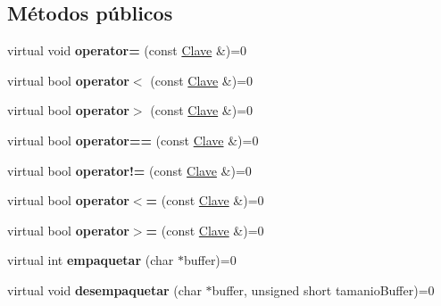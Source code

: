 \subsection*{\-Métodos públicos}
\begin{DoxyCompactItemize}
\item 
\hypertarget{class_clave_a127484386e919473d48224e8a031f804}{virtual void {\bfseries operator=} (const \hyperlink{class_clave}{\-Clave} \&)=0}\label{class_clave_a127484386e919473d48224e8a031f804}

\item 
\hypertarget{class_clave_a21773e9e0bbee22cceb7d6dc9d2c3138}{virtual bool {\bfseries operator$<$} (const \hyperlink{class_clave}{\-Clave} \&)=0}\label{class_clave_a21773e9e0bbee22cceb7d6dc9d2c3138}

\item 
\hypertarget{class_clave_a1184b1c4de99b7dde9ae5f768a18fc72}{virtual bool {\bfseries operator$>$} (const \hyperlink{class_clave}{\-Clave} \&)=0}\label{class_clave_a1184b1c4de99b7dde9ae5f768a18fc72}

\item 
\hypertarget{class_clave_a628c3353ab08690438bc8edc1b0d26f0}{virtual bool {\bfseries operator==} (const \hyperlink{class_clave}{\-Clave} \&)=0}\label{class_clave_a628c3353ab08690438bc8edc1b0d26f0}

\item 
\hypertarget{class_clave_a38d931bee4e3129d7a519eabad5eaa40}{virtual bool {\bfseries operator!=} (const \hyperlink{class_clave}{\-Clave} \&)=0}\label{class_clave_a38d931bee4e3129d7a519eabad5eaa40}

\item 
\hypertarget{class_clave_af1572c67203839054c6e3002791200d0}{virtual bool {\bfseries operator$<$=} (const \hyperlink{class_clave}{\-Clave} \&)=0}\label{class_clave_af1572c67203839054c6e3002791200d0}

\item 
\hypertarget{class_clave_ac8b00edcd498bbed3b23d5097b640bc6}{virtual bool {\bfseries operator$>$=} (const \hyperlink{class_clave}{\-Clave} \&)=0}\label{class_clave_ac8b00edcd498bbed3b23d5097b640bc6}

\item 
\hypertarget{class_clave_ac742da7e215c800c21837a9a257a98a1}{virtual int {\bfseries empaquetar} (char $\ast$buffer)=0}\label{class_clave_ac742da7e215c800c21837a9a257a98a1}

\item 
\hypertarget{class_clave_abe524b2fd3cf2cd7b61c9099a02142b7}{virtual void {\bfseries desempaquetar} (char $\ast$buffer, unsigned short tamanio\-Buffer)=0}\label{class_clave_abe524b2fd3cf2cd7b61c9099a02142b7}


\end{DoxyCompactItemize}
